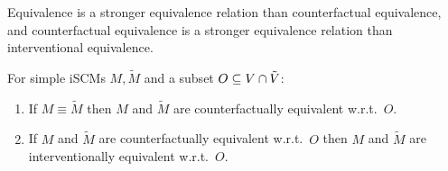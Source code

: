 Equivalence is a stronger equivalence relation than counterfactual equivalence,
and counterfactual equivalence is a stronger equivalence relation than interventional equivalence.
\begin{Prp}\label{prp:pearls_ladder_levels_2_and_3}
  For simple iSCMs $M, \tilde{M}$ and a subset $O \subseteq V \cap \tilde{V}$:
  \begin{enumerate}
    \item If $M \equiv \tilde{M}$ then $M$ and $\tilde{M}$ are counterfactually equivalent w.r.t.\ $O$.
    \item If $M$ and $\tilde{M}$ are counterfactually equivalent w.r.t.\ $O$ then $M$ and $\tilde{M}$ are interventionally equivalent w.r.t.\ $O$.
  \end{enumerate}
\end{Prp}
